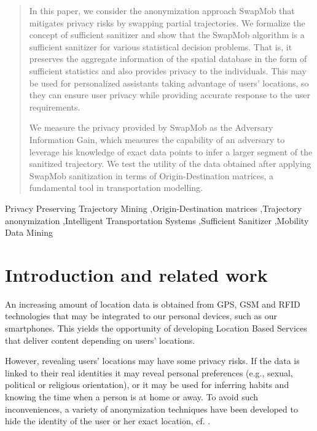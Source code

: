 \documentclass[times,twocolumn,final,authoryear]{elsarticle}
\begin{document}
\begin{frontmatter}
\begin{abstract}
In this paper, we consider the anonymization approach SwapMob that mitigates privacy risks by swapping partial trajectories. We formalize the concept of sufficient sanitizer and show that the SwapMob algorithm is a sufficient sanitizer for various statistical decision problems. That is, it preserves the aggregate information of the spatial database in the form of sufficient statistics and also provides privacy to the individuals. 
This may be used for personalized assistants taking advantage of users' locations, so they can ensure user privacy while providing accurate response to the user requirements.

We measure the privacy provided by SwapMob as the Adversary Information Gain, which measures the capability of an adversary to leverage his knowledge of exact data points to infer a larger segment of the sanitized trajectory. 
We test the utility of the data obtained after applying SwapMob sanitization in terms of Origin-Destination matrices, a fundamental tool in  transportation modelling.


\end{abstract}




\begin{keyword}
\KWD Privacy Preserving Trajectory Mining \sep Origin-Destination matrices \sep Trajectory anonymization
\sep Intelligent Transportation Systems \sep Sufficient Sanitizer \sep Mobility Data Mining

\end{keyword}

\end{frontmatter}


\section{Introduction and related work}

An increasing amount of location data is obtained from GPS, GSM and RFID technologies that may be integrated to our personal devices, such as our smartphones. This yields the opportunity of developing Location Based Services that deliver content depending on users' locations.

However, revealing users' locations may have some privacy risks. If the data is linked to their real identities it may reveal personal preferences (e.g., sexual, political or religious orientation), or it may be used for inferring habits and knowing the time when a person is at home or away.
To avoid such inconveniences, a variety of anonymization techniques have been developed to hide the identity of the user or her exact location, cf. \cite{Terrovitis:2011}.
\end{document}
